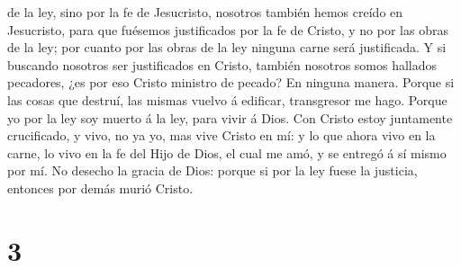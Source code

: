 de la ley, sino por la fe de Jesucristo, nosotros también hemos creído
en Jesucristo, para que fuésemos justificados por la fe de Cristo, y no
por las obras de la ley; por cuanto por las obras de la ley ninguna
carne será justificada.  Y si buscando nosotros ser
justificados en Cristo, también nosotros somos hallados pecadores, ¿es
por eso Cristo ministro de pecado? En ninguna manera. 
Porque si las cosas que destruí, las mismas vuelvo á edificar,
transgresor me hago.  Porque yo por la ley soy muerto á
la ley, para vivir á Dios.  Con Cristo estoy juntamente
crucificado, y vivo, no ya yo, mas vive Cristo en mí: y lo que ahora
vivo en la carne, lo vivo en la fe del Hijo de Dios, el cual me amó, y
se entregó á sí mismo por mí.  No desecho la gracia de
Dios: porque si por la ley fuese la justicia, entonces por demás murió
Cristo.

\hypertarget{section-2}{%
\section{3}\label{section-2}}


